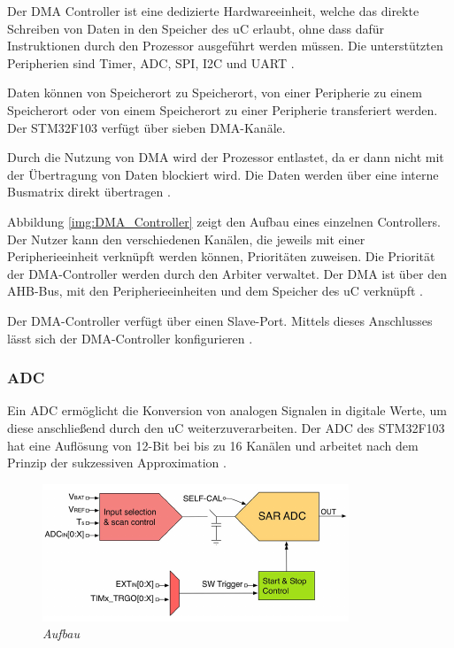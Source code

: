 Der \acl{DMA} Controller ist eine dedizierte Hardwareeinheit, welche das direkte Schreiben von Daten in den Speicher des \ac{uC} erlaubt, ohne dass dafür Instruktionen durch den Prozessor
ausgeführt werden müssen. Die unterstützten Peripherien sind Timer, \acs{ADC}, \acs{SPI}, \acs{I2C} und \acs{UART} \citep{STM32_Datasheet}.

\smallskip

Daten können von Speicherort zu Speicherort, von einer Peripherie zu einem Speicherort oder von einem Speicherort zu einer Peripherie transferiert werden.
Der STM32F103 verfügt über sieben \ac{DMA}-Kanäle.

\smallskip

Durch die Nutzung von \ac{DMA} wird der Prozessor entlastet, da er dann nicht mit der Übertragung von Daten blockiert wird. Die Daten werden 
über eine interne Busmatrix direkt übertragen \citep{MasteringSTM}.

\smallskip

Abbildung \ref{img:DMA_Controller} zeigt den Aufbau eines einzelnen Controllers. Der Nutzer kann den verschiedenen Kanälen,
die jeweils mit einer Peripherieeinheit verknüpft werden können, Prioritäten zuweisen. Die Priorität der DMA-Controller werden durch den Arbiter verwaltet.
Der \ac{DMA} ist über den \ac{AHB-Bus}, mit den 
Peripherieeinheiten und dem Speicher des \ac{uC} verknüpft \citep{MasteringSTM}.

\smallskip

Der \ac{DMA}-Controller verfügt über einen Slave-Port. Mittels dieses Anschlusses lässt sich der \ac{DMA}-Controller konfigurieren \citep{MasteringSTM}.

\newpage

\subsubsection{ADC}

Ein \acs{ADC} ermöglicht die Konversion von analogen Signalen in digitale Werte, um diese anschließend durch den \ac{uC} weiterzuverarbeiten. 
Der \ac{ADC} des STM32F103 hat eine Auflösung von 12-Bit bei bis zu 16 Kanälen und arbeitet nach dem Prinzip der sukzessiven Approximation \citep{STM32_Datasheet}.

\smallskip


\begin{figure}[h]
     \vspace{-\baselineskip}
         \centering
         \includegraphics[scale=0.6]{Pictures/adc.png}
         \caption{\textit{Aufbau \citep{MasteringSTM}}}
         \label{img:ADC}
\end{figure}


